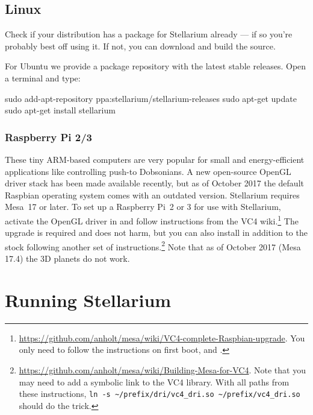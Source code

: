 \subsection{Linux}
\label{sec:GettingStarted:Installation:Linux}

Check if your distribution has a package for Stellarium already --- if
so you're probably best off using it. If not, you can download and build
the source.

For Ubuntu we provide a package repository with the latest stable
releases. Open a terminal and type:

\begin{commands}
sudo add-apt-repository ppa:stellarium/stellarium-releases
sudo apt-get update
sudo apt-get install stellarium
\end{commands}

\subsubsection{Raspberry Pi 2/3}
These tiny ARM-based computers are very popular for small and energy-efficient applications like controlling push-to Dobsonians. 
A new open-source OpenGL driver stack has been made available recently, but as of October 2017 the default 
Raspbian operating system comes with an outdated version. Stellarium requires Mesa~17 or later. 
To set up a Raspberry Pi~2 or 3 for use with Stellarium, activate the OpenGL driver in 
 and follow instructions from the VC4 wiki.\footnote{%
	\url{https://github.com/anholt/mesa/wiki/VC4-complete-Raspbian-upgrade}. You only need to follow the instructions on first boot,  and .} 
The  upgrade is required and does not harm, but you can also install  in addition to the stock  
following another set of instructions.\footnote{\url{https://github.com/anholt/mesa/wiki/Building-Mesa-for-VC4}. 
	Note that you may need to add a symbolic link to the VC4 library. With all paths from these instructions, 
	\verb|ln -s ~/prefix/dri/vc4_dri.so ~/prefix/vc4_dri.so| should do the trick.}
Note that as of October 2017 (Mesa 17.4) the 3D planets do not work.
	
	


\section{Running Stellarium}
\label{sec:GettingStarted:Running}

